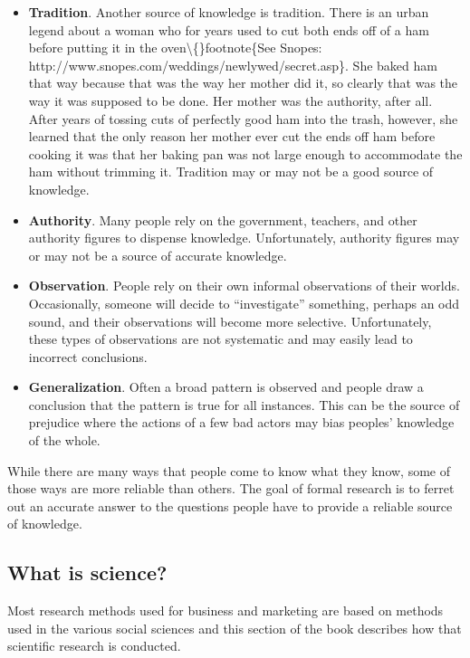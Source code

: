 \begin{itemize}
	\item \textbf{Tradition}. Another source of knowledge is tradition. There is an urban legend about a woman who for years used to cut both ends off of a ham before putting it in the oven\textbackslash\{\}footnote\{See Snopes: http://www.snopes.com/weddings/newlywed/secret.asp\}. She baked ham that way because that was the way her mother did it, so clearly that was the way it was supposed to be done. Her mother was the authority, after all. After years of tossing cuts of perfectly good ham into the trash, however, she learned that the only reason her mother ever cut the ends off ham before cooking it was that her baking pan was not large enough to accommodate the ham without trimming it. Tradition may or may not be a good source of knowledge.
	
	\item \textbf{Authority}. Many people rely on the government, teachers, and other authority figures to dispense knowledge. Unfortunately, authority figures may or may not be a source of accurate knowledge.
	
	\item \textbf{Observation}. People rely on their own informal observations of their worlds. Occasionally, someone will decide to ``investigate'' something, perhaps an odd sound, and their observations will become more selective. Unfortunately, these types of observations are not systematic and may easily lead to incorrect conclusions.
	
	\item \textbf{Generalization}. Often a broad pattern is observed and people draw a conclusion that the pattern is true for all instances. This can be the source of prejudice where the actions of a few bad actors may bias peoples' knowledge of the whole.
	
\end{itemize} 

While there are many ways that people come to know what they know, some of those ways are more reliable than others. The goal of formal research is to ferret out an accurate answer to the questions people have \textemdash \; to provide a reliable source of knowledge. 

\subsection{What is science?}

Most research methods used for business and marketing are based on methods used in the various social sciences and this section of the book describes how that scientific research is conducted.

